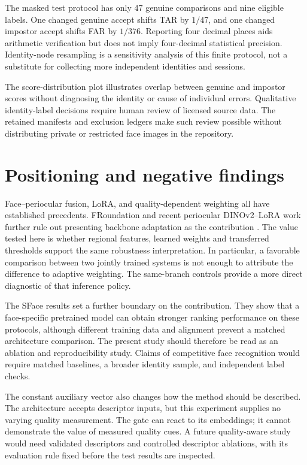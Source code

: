 \documentclass[12pt,a4paper,oneside]{report}
\begin{document}
The masked test protocol has only 47 genuine comparisons and nine eligible labels. One changed genuine accept shifts TAR by $1/47$, and one changed impostor accept shifts FAR by $1/376$. Reporting four decimal places aids arithmetic verification but does not imply four-decimal statistical precision. Identity-node resampling is a sensitivity analysis of this finite protocol, not a substitute for collecting more independent identities and sessions.

The score-distribution plot illustrates overlap between genuine and impostor scores without diagnosing the identity or cause of individual errors. Qualitative identity-label decisions require human review of licensed source data. The retained manifests and exclusion ledgers make such review possible without distributing private or restricted face images in the repository.

\section{Positioning and negative findings}
Face--periocular fusion, LoRA, and quality-dependent weighting all have established precedents. FRoundation and recent periocular DINOv2--LoRA work further rule out presenting backbone adaptation as the contribution \cite{froundation2025,perilora2026}. The value tested here is whether regional features, learned weights and transferred thresholds support the same robustness interpretation. In particular, a favorable comparison between two jointly trained systems is not enough to attribute the difference to adaptive weighting. The same-branch controls provide a more direct diagnostic of that inference policy.

The SFace results set a further boundary on the contribution. They show that a face-specific pretrained model can obtain stronger ranking performance on these protocols, although different training data and alignment prevent a matched architecture comparison. The present study should therefore be read as an ablation and reproducibility study. Claims of competitive face recognition would require matched baselines, a broader identity sample, and independent label checks.

\enlargethispage{\baselineskip}
The constant auxiliary vector also changes how the method should be described. The architecture accepts descriptor inputs, but this experiment supplies no varying quality measurement. The gate can react to its embeddings; it cannot demonstrate the value of measured quality cues. A future quality-aware study would need validated descriptors and controlled descriptor ablations, with its evaluation rule fixed before the test results are inspected.
\end{document}
